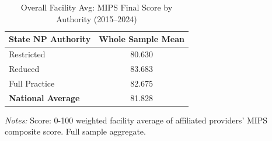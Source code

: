 \begin{table}[htbp]
    \centering
    \caption{Overall Facility Avg: MIPS Final Score by Authority (2015--2024)}
    \label{tab:fac_mips_final_score_full}
    \vspace{0.2cm}
    \begin{tabular}{lc}
        \toprule
        \textbf{State NP Authority} & \textbf{Whole Sample Mean} \\
        \midrule
        Restricted & 80.630 \\
        Reduced & 83.683 \\
        Full Practice & 82.675 \\
        \midrule
        \textbf{National Average} & 81.828 \\
        \bottomrule
    \end{tabular}
    \vspace{0.1cm}
    \begin{minipage}{0.6\textwidth}
        \footnotesize \textit{Notes:} Score: 0-100 weighted facility average of affiliated providers' MIPS composite score. Full sample aggregate.
    \end{minipage}
\end{table}